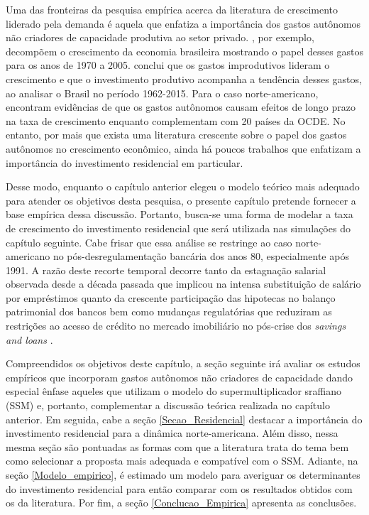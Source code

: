 Uma das fronteiras da pesquisa empírica acerca da literatura de crescimento liderado pela demanda é aquela que enfatiza a importância dos gastos autônomos não criadores de capacidade produtiva ao setor privado. \textcite{freitas_pattern_2013}, por exemplo, decompõem o crescimento da economia brasileira mostrando o papel desses gastos para os anos de  1970 a 2005. \textcite{braga_investment_2018} conclui que os gastos improdutivos lideram o crescimento e que o investimento produtivo acompanha a tendência desses gastos, ao analisar o Brasil no período 1962-2015. Para o caso norte-americano, \textcite{girardi_long-run_2016} encontram evidências de que os gastos autônomos causam efeitos de longo prazo na taxa de crescimento enquanto \textcite{girardi_autonomous_2018} complementam com 20 países da OCDE. No entanto, por mais que exista uma literatura crescente sobre o papel dos gastos autônomos no crescimento econômico, ainda há poucos trabalhos que enfatizam a importância do investimento residencial em particular. 

Desse modo, enquanto o capítulo anterior elegeu o modelo teórico mais adequado para atender os objetivos desta pesquisa, o presente capítulo pretende fornecer a base empírica dessa discussão. Portanto, busca-se uma forma de modelar a taxa de crescimento do investimento residencial que será utilizada nas simulações do capítulo seguinte. 
Cabe frisar que essa análise se restringe ao caso norte-americano no pós-desregulamentação bancária dos anos 80, especialmente após 1991. A razão deste recorte temporal decorre tanto da estagnação salarial observada desde a década passada \cites{mian_house_2011}{teixeira_uma_2011} que implicou na intensa substituição de salário por empréstimos \cite{barba_rising_2009} quanto da crescente participação das hipotecas no balanço patrimonial dos bancos \cite{jorda_great_2014} bem como mudanças regulatórias que reduziram as restrições ao acesso de crédito no mercado imobiliário no pós-crise dos \textit{savings and loans} \cites{linneman_impacts_1989}{duca_empirical_1991}{federal_deposit_insurance_corporation_savings_1997}. 

Compreendidos os objetivos deste capítulo, a seção seguinte irá avaliar os estudos empíricos que incorporam gastos autônomos não criadores de capacidade dando especial ênfase aqueles que utilizam o modelo do supermultiplicador sraffiano (SSM) e, portanto, complementar a discussão teórica realizada no capítulo anterior. 
Em seguida, cabe a seção \ref{Secao_Residencial} destacar a importância do investimento residencial para a dinâmica norte-americana. Além disso, nessa mesma seção são pontuadas as formas com que a literatura trata do tema bem como selecionar a proposta mais adequada e compatível com o SSM. 
Adiante, na seção \ref{Modelo_empirico}, é estimado um modelo  para averiguar os determinantes do investimento residencial para então comparar com os resultados obtidos com os da literatura. Por fim, a seção \ref{Conclucao_Empirica} apresenta as conclusões.